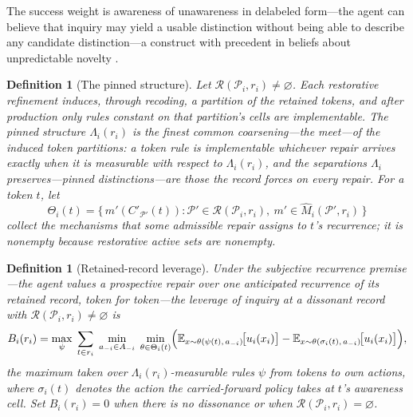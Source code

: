 \documentclass[11pt]{article}
\newtheorem{definition}[assumption]{Definition}
\theoremstyle{definition}
\newcommand{\emptysetset}{\varnothing}
\begin{document}
The success weight is awareness of unawareness in delabeled form---the agent
can believe that inquiry may yield a usable distinction without being able
to describe any candidate distinction---a construct with precedent in
beliefs about unpredictable novelty \citep{Schipper2025,KarniViero2017}.

\begin{definition}[The pinned structure]
\label{def:pinned}
Let $\mathcal R(\mathcal P_i,r_i)\neq\emptysetset$.  Each restorative
refinement induces, through recoding, a partition of the retained tokens,
and after production only rules constant on that partition's cells are
implementable.  The \emph{pinned structure} $\Lambda_i(r_i)$ is the finest
common coarsening---the meet---of the induced token partitions: a token rule
is implementable \emph{whichever repair arrives} exactly when it is
measurable with respect to $\Lambda_i(r_i)$, and the separations
$\Lambda_i$ preserves---\emph{pinned distinctions}---are those the record
forces on every repair.  For a token $t$, let
\[
\Theta_i(t)
=
\bigl\{\,m'(C'_{\mathcal P'}(t)) :
\mathcal P'\in\mathcal R(\mathcal P_i,r_i),\
m'\in\widehat M_i(\mathcal P',r_i)\,\bigr\}
\]
collect the mechanisms that some admissible repair assigns to $t$'s
recurrence; it is nonempty because restorative active sets are nonempty.
\end{definition}

\begin{definition}[Retained-record leverage]
\label{def:leverage}
Under the \emph{subjective recurrence premise}---the agent values a
prospective repair over one anticipated recurrence of its retained record,
token for token---the leverage of inquiry at a dissonant record with
$\mathcal R(\mathcal P_i,r_i)\neq\emptysetset$ is
\begin{equation}
B_i(r_i)
=
\max_{\psi}\;
\sum_{t\in r_i}\;
\min_{a_{-i}\in A_{-i}}\;
\min_{\theta\in\Theta_i(t)}
\Bigl(
\mathbb E_{x\sim\theta(\psi(t),\,a_{-i})}\!\bigl[u_i(x_i)\bigr]
-
\mathbb E_{x\sim\theta(\sigma_i(t),\,a_{-i})}\!\bigl[u_i(x_i)\bigr]
\Bigr),
\label{eq:leverage}
\end{equation}
the maximum taken over $\Lambda_i(r_i)$-measurable rules $\psi$ from tokens
to own actions, where $\sigma_i(t)$ denotes the action the carried-forward
policy takes at $t$'s awareness cell.  Set $B_i(r_i)=0$ when there is no
dissonance or when $\mathcal R(\mathcal P_i,r_i)=\emptysetset$.
\end{definition}
\end{document}
